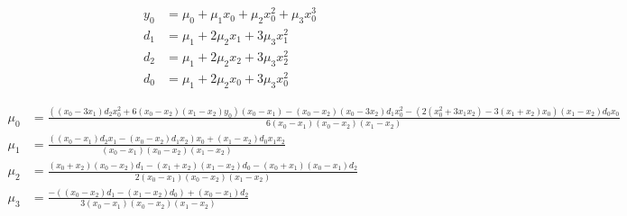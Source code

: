 \begin{align}
  y_0 & = \mu_0+\mu_1 x_0+\mu_2 x_0^{2}+\mu_3 x_0^{3}  \\
   d_1 & = \mu_1+2 \mu_2 x_1+3 \mu_3 x_1^{2}  \\
   d_2 & = \mu_1+2 \mu_2  x_2+3 \mu_3 x_2^{2}  \\
   d_0 & = \mu_1+2 \mu_2 x_0+3 \mu_3 x_0^{2}  
\end{align}

 
\begin{align}
  \mu_0 & = \frac
{ \left(  \left( x_0 - 3 x_1 \right)  d_2 x_0^{2}+6  \left( x_0 - x_2 \right)    \left( x_1 - x_2 \right)  y_0 \right)   \left( x_0 - x_1 \right)  -  \left( x_0 - x_2 \right)    \left( x_0 - 3 x_2 \right)  d_1 x_0^{2} -  \left( 2  \left( x_0^{2}+3 x_1 x_2 \right)  - 3   \left( x_1+x_2 \right)  x_0 \right)   \left( x_1 - x_2 \right)  d_0 x_0}
{6   \left( x_0 - x_1 \right)   \left( x_0 - x_2 \right)   \left( x_1 - x_2 \right) } \\
   \mu_1 & = \frac
{ \left(  \left( x_0 - x_1 \right)  d_2 x_1 -  \left( x_0 - x_2 \right)  d_1 x_2 \right)  x_0+  \left( x_1 - x_2 \right)  d_0 x_1 x_2}
{ \left( x_0 - x_1 \right)   \left( x_0 - x_2  \right)   \left( x_1 - x_2 \right) } \\
   \mu_2 & = \frac
{ \left( x_0+x_2 \right)   \left( x_0  - x_2 \right)  d_1 -  \left( x_1+x_2 \right)   \left( x_1 - x_2 \right)  d_0 -  \left( x_0+x_1  \right)   \left( x_0 - x_1 \right)  d_2}
{2  \left( x_0 - x_1 \right)   \left( x_0  - x_2 \right)   \left( x_1 - x_2 \right) } \\
   \mu_3 & = \frac
{ -  \left(  \left( x_0 - x_2  \right)  d_1 -  \left( x_1 - x_2 \right)  d_0 \right) + \left( x_0 - x_1 \right)  d_2}
{3  \left( x_0 - x_1 \right)   \left( x_0 - x_2 \right)   \left( x_1 - x_2 \right) } 
\end{align}
